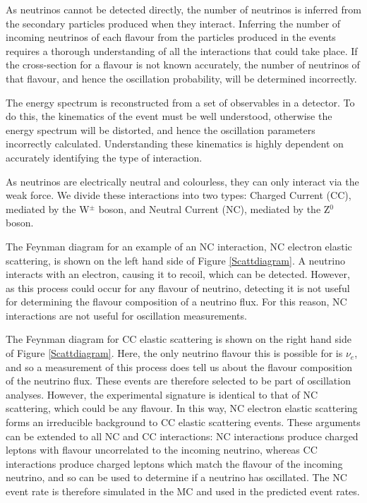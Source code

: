 As neutrinos cannot be detected directly, the number of neutrinos is inferred from the secondary particles produced when they interact. Inferring the number of incoming neutrinos of each flavour from the particles produced in the events requires a thorough understanding of all the interactions that could take place. If the cross-section for a flavour is not known accurately, the number of neutrinos of that flavour, and hence the oscillation probability, will be determined incorrectly.

The energy spectrum is reconstructed from a set of observables in a detector. To do this, the kinematics of the event must be well understood, otherwise the  energy spectrum will be distorted, and hence the oscillation parameters incorrectly calculated. Understanding these kinematics is highly dependent on accurately identifying the type of interaction. 

As neutrinos are electrically neutral and colourless, they can only interact via the weak force. We divide these interactions into two types: Charged Current (CC), mediated by the W$^\pm$ boson, and Neutral Current (NC), mediated by the Z$^0$ boson.

The Feynman diagram for an example of an NC interaction, NC electron elastic scattering, is shown on the left hand side of Figure \ref{Scattdiagram}. A neutrino interacts with an electron, causing it to recoil, which can be detected. However, as this process could occur for any flavour of neutrino, detecting it is not useful for determining the flavour composition of a neutrino flux. For this reason, NC interactions are not useful for oscillation measurements.

The Feynman diagram for CC elastic scattering is shown on the right hand side of Figure \ref{Scattdiagram}. Here, the only neutrino flavour this is possible for is $\nu_e$, and so a measurement of this process does tell us about the flavour composition of the neutrino flux. These events are therefore selected to be part of oscillation analyses. However, the experimental signature is identical to that of NC scattering, which could be any flavour. In this way, NC electron elastic scattering forms an irreducible background to CC elastic scattering events. These arguments can be extended to all NC and CC interactions: NC interactions produce charged leptons with flavour uncorrelated to the incoming neutrino, whereas CC interactions produce charged leptons which match the flavour of the incoming neutrino, and so can be used to determine if a neutrino has oscillated. The NC event rate is therefore simulated in the MC and used in the predicted event rates. 

